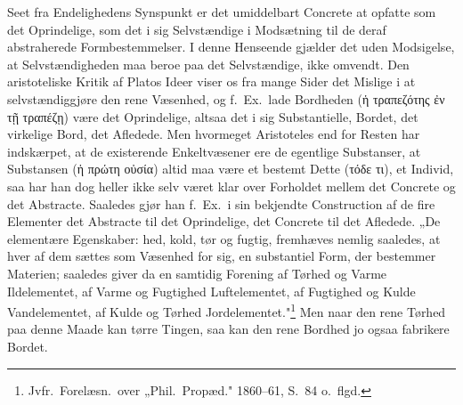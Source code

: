 \documentclass[12pt]{book}
\begin{document}
Seet fra Endelighedens Synspunkt er det umiddelbart Concrete at opfatte som det
Oprindelige, som det i sig Selvstændige i Modsætning til de deraf abstraherede
Formbestemmelser. I denne Henseende gjælder det uden Modsigelse, at Selvstændigheden maa
beroe paa det Selvstændige, ikke omvendt. Den aristoteliske Kritik af Platos Ideer viser
os fra mange Sider det Mislige i at selvstændiggjøre den rene Væsenhed, og f.\ Ex.\ lade
Bordheden (ἡ τραπεζότης ἐν τῇ τραπέζῃ) være det Oprindelige, altsaa det i sig
Substantielle, Bordet, det virkelige Bord, det Afledede. Men hvormeget Aristoteles end
for Resten har indskærpet, at de existerende Enkeltvæsener ere de egentlige Substanser,
at Substansen (ἡ πρώτη οὐσία) altid maa være et bestemt Dette (τόδε τι), et Individ, saa
har han dog heller ikke selv været klar over Forholdet mellem det Concrete og det
Abstracte. Saaledes gjør han f.\ Ex.\ i sin bekjendte Construction af de fire Elementer
det Abstracte til det Oprindelige, det Concrete til det Afledede. „De elementære
Egenskaber: hed, kold, tør og fugtig, fremhæves nemlig saaledes, at hver af dem sættes
som Væsenhed for sig, en substantiel Form, der bestemmer Materien; saaledes giver da en
samtidig Forening af Tørhed og Varme Ildelementet, af Varme og Fugtighed Luftelementet,
af Fugtighed og Kulde Vandelementet, af Kulde og Tørhed
Jordelementet."\footnote{Jvfr.\ Forelæsn.\ over „Phil.\ Propæd." 1860--61, S.~84 o.\
flgd.} Men naar den rene Tørhed paa denne Maade kan tørre Tingen, saa kan den rene
Bordhed jo ogsaa fabrikere Bordet.
\end{document}
